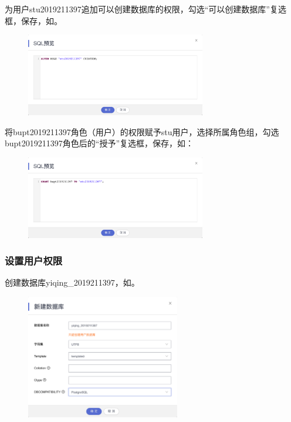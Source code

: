 \documentclass[lang=cn,11pt,a4paper,cite=authornum]{paper}
\begin{document}
为用户stu2019211397追加可以创建数据库的权限，勾选“可以创建数据库”复选框，保存，如。
\begin{figure}[!htb]
    \centering
    \includegraphics[width=0.7\textwidth]{./images/res4.png}
    \caption{\label{fig:res4}}
\end{figure}

将bupt2019211397角色（用户）的权限赋予stu用户，选择所属角色组，勾选bupt2019211397角色后的“授予”复选框，保存，如：

\begin{figure}[!htb]
    \centering
    \includegraphics[width=0.7\textwidth]{./images/res5.png}
    \caption{\label{fig:res5}}
\end{figure}

\subsubsection{设置用户权限}

创建数据库yiqing\_2019211397，如。
\begin{figure}[!htb]
    \centering
    \includegraphics[width=0.6\textwidth]{./images/res6.png}
    \caption{\label{fig:res6}}
\end{figure}
\end{document}
